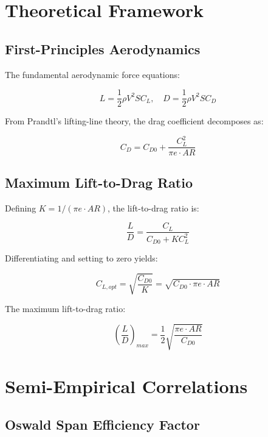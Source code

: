 \documentclass[11pt,a4paper]{article}
\begin{document}
\section{Theoretical Framework}

\subsection{First-Principles Aerodynamics}

The fundamental aerodynamic force equations:

\begin{equation}
L = \frac{1}{2}\rho V^2 S C_L, \quad D = \frac{1}{2}\rho V^2 S C_D
\end{equation}

From Prandtl's lifting-line theory, the drag coefficient decomposes as:

\begin{equation}
C_D = C_{D0} + \frac{C_L^2}{\pi e \cdot AR}
\end{equation}

\subsection{Maximum Lift-to-Drag Ratio}

Defining $K = 1/(\pi e \cdot AR)$, the lift-to-drag ratio is:

\begin{equation}
\frac{L}{D} = \frac{C_L}{C_{D0} + K C_L^2}
\end{equation}

Differentiating and setting to zero yields:

\begin{equation}
C_{L,opt} = \sqrt{\frac{C_{D0}}{K}} = \sqrt{C_{D0} \cdot \pi e \cdot AR}
\end{equation}

The maximum lift-to-drag ratio:

\begin{equation}
\boxed{\left(\frac{L}{D}\right)_{max} = \frac{1}{2}\sqrt{\frac{\pi e \cdot AR}{C_{D0}}}}
\end{equation}

\section{Semi-Empirical Correlations}

\subsection{Oswald Span Efficiency Factor}
\end{document}
